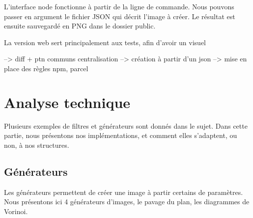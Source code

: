 \documentclass{article}
\begin{document}
L'interface node fonctionne à partir de la ligne de commande. 
Nous pouvons passer en argument le fichier JSON qui décrit l'image à créer. Le résultat est ensuite sauvegardé en PNG dans le dossier public.

La version web sert principalement aux tests, afin d'avoir un visuel

--> diff + ptn communs centralisation 
--> création à partir d'un json
--> mise en place des règles npm, parcel


\section{Analyse technique}

Plusieurs exemples de filtres et générateurs sont donnés dans le sujet. Dans cette partie, nous présentons nos implémentations, et comment elles s'adaptent, ou non, à nos structures.

\subsection{Générateurs}

Les générateurs permettent de créer une image à partir certains de paramètres. Nous présentons ici 4 générateurs d'images, le pavage du plan, les diagrammes de Vorinoi. 
\end{document}
